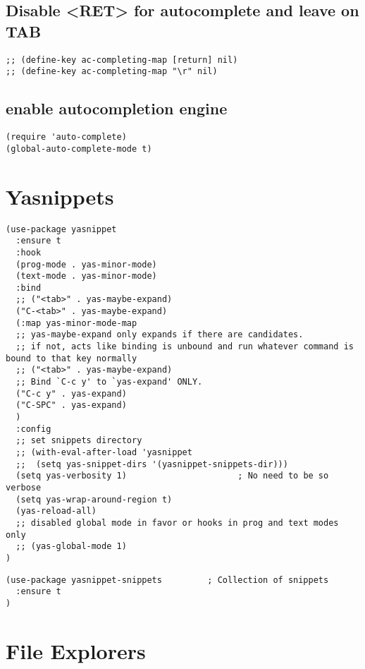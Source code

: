 \documentclass[11pt]{article}
\begin{document}
\subsection*{Disable <RET> for autocomplete and leave on TAB}
\label{sec:orgd54f4b0}
\begin{verbatim}
;; (define-key ac-completing-map [return] nil)
;; (define-key ac-completing-map "\r" nil)
\end{verbatim}


\subsection*{enable autocompletion engine}
\label{sec:org9ab53f9}
\begin{verbatim}
(require 'auto-complete)
(global-auto-complete-mode t)
\end{verbatim}

\section*{Yasnippets}
\label{sec:org25509b2}

\begin{verbatim}
(use-package yasnippet
  :ensure t
  :hook
  (prog-mode . yas-minor-mode)
  (text-mode . yas-minor-mode)
  :bind
  ;; ("<tab>" . yas-maybe-expand)
  ("C-<tab>" . yas-maybe-expand)
  (:map yas-minor-mode-map
  ;; yas-maybe-expand only expands if there are candidates.
  ;; if not, acts like binding is unbound and run whatever command is bound to that key normally
  ;; ("<tab>" . yas-maybe-expand)
  ;; Bind `C-c y' to `yas-expand' ONLY.
  ("C-c y" . yas-expand)
  ("C-SPC" . yas-expand)
  )
  :config
  ;; set snippets directory
  ;; (with-eval-after-load 'yasnippet
  ;;  (setq yas-snippet-dirs '(yasnippet-snippets-dir)))
  (setq yas-verbosity 1)                      ; No need to be so verbose
  (setq yas-wrap-around-region t)
  (yas-reload-all)
  ;; disabled global mode in favor or hooks in prog and text modes only
  ;; (yas-global-mode 1)
)
\end{verbatim}

\begin{verbatim}
(use-package yasnippet-snippets         ; Collection of snippets
  :ensure t
)
\end{verbatim}


\section*{File Explorers}
\label{sec:orgf884f24}
\end{document}
